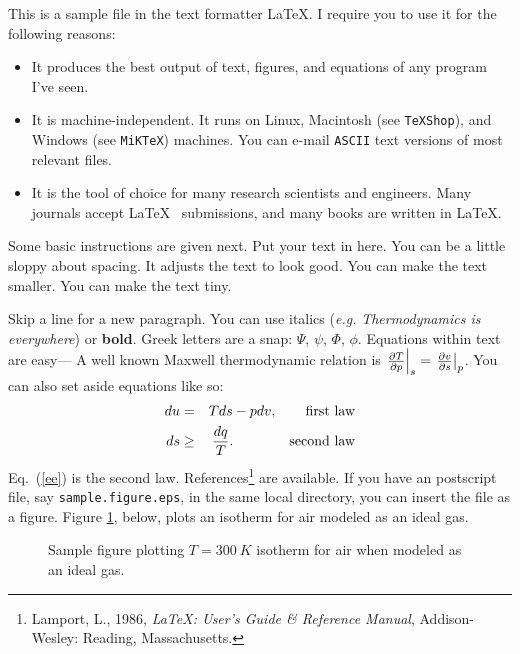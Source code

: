 \documentclass{article}
\begin{document}

\medskip
This is a sample file in the text formatter \LaTeX.
I require you to use it for the following reasons:

\begin{itemize}

\item{It produces the best output of text, figures,
      and equations of any
      program I've seen.}

\item{It is machine-independent. It runs on Linux, Macintosh (see {\tt TeXShop}), and Windows (see {\tt MiKTeX}) machines.
     You can e-mail {\tt ASCII} text versions of most relevant files.}

\item{It is the tool of choice for many research
     scientists and engineers.
     Many journals accept 
     \LaTeX~ submissions, and many books
     are written in \LaTeX.}

\end{itemize}
\medskip
Some basic instructions are given next.
Put your text in here.  You can be a little sloppy    about
spacing.  It adjusts the text to look good.
{\small You can make the text smaller.}
{\tiny You can make the text tiny.}

Skip a line for a new paragraph.   
You can use italics ({\em e.g.} {\em  Thermodynamics is everywhere}) or {\bf bold}.
Greek letters are a snap: $\Psi$, $\psi$,
$\Phi$, $\phi$.  Equations within text are easy---
A well known Maxwell thermodynamic relation is
$\left.{\partial T \over \partial p}\right|_{s} = 
\left.{\partial v \over \partial s}\right|_{p}$.
You can also set aside equations like so:
\begin{eqnarray}
du &=& Tds -p dv, \qquad \mbox{first law}\\
ds &\ge& {dq \over T}.\qquad  \qquad \mbox{second law} \label{ee}
\end{eqnarray}
Eq.~(\ref{ee}) is the second law.
References\footnote{Lamport, L., 1986, {\em \LaTeX: User's Guide \& Reference Manual},
    Addison-Wesley: Reading, Massachusetts.}
are available. 
If you have an postscript file, say {\tt sample.figure.eps}, in the same local directory,
you can insert the file as a figure.  Figure \ref{sample}, below, plots an isotherm for air modeled as an ideal gas. 
\begin{figure}[ht]
\epsfxsize=2.5in
\centerline{}
\caption{Sample figure plotting $T=300~K$ isotherm for air when modeled as an ideal gas.}
\label{sample}
\end{figure}
\end{document}
